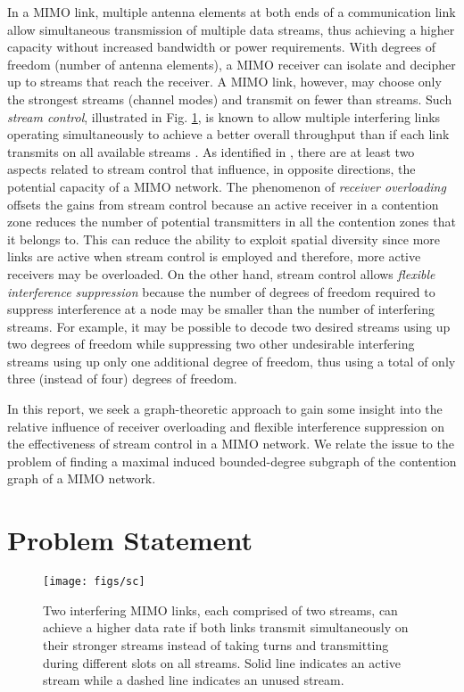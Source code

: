\documentclass[journal,12pt,onecolumn]{IEEEtran}
\begin{document}
In a MIMO link, multiple antenna elements at both ends of a communication
link allow simultaneous transmission of multiple data streams, thus
achieving a higher capacity without increased bandwidth or power
requirements. With  degrees of freedom (number of antenna
elements), a MIMO receiver can isolate and decipher up to  streams
that reach the receiver. A MIMO link, however, may choose only the
strongest streams (channel modes) and transmit on fewer than 
streams. Such {\em stream control}, illustrated in Fig.\,\,\ref{fig:sc}, is known to allow multiple 
interfering links operating simultaneously to achieve a better overall
throughput than if each link transmits on all 
available streams \cite{DemIng2003,BluWin2002}. As identified in
\cite{SunSiv2004}, there are at least two aspects 
related to stream control that influence, in opposite directions, the
potential capacity of a MIMO network. The phenomenon of {\em receiver
  overloading} offsets the gains from stream control because an active
receiver in a contention zone reduces the number of
potential transmitters in all the contention zones that it belongs
to. This can reduce the ability to exploit spatial diversity since more links are active when stream
control is employed and therefore, more active receivers may be
overloaded. On the other hand, stream control allows {\em flexible 
  interference suppression} because the number of degrees of freedom
required to suppress interference at a node may be smaller than the
number of interfering streams. For example, it may be possible to
decode two desired streams using up two degrees of freedom while
suppressing two other undesirable interfering streams using up only
one additional degree of freedom, thus using a total of only three
(instead of four) degrees of freedom. 

In this report, we seek a graph-theoretic approach to gain some
insight into the relative influence of receiver overloading and
flexible interference suppression on the effectiveness of stream
control in a MIMO network. We relate the issue to the problem of
finding a maximal induced bounded-degree subgraph of the contention
graph of a MIMO network.

\section{Problem Statement}
\label{sec:problem}

\begin{figure}[!t]
\begin{center}
\texttt{[image: figs/sc]}
\caption{Two interfering MIMO links, each comprised of two streams, can achieve a higher data 
rate if both links transmit simultaneously on their stronger
streams instead of taking turns and transmitting during different
slots on all streams. Solid line indicates an active stream while a
dashed line indicates an unused stream.} 
\label{fig:sc}
\end{center}
\end{figure}
\end{document}
